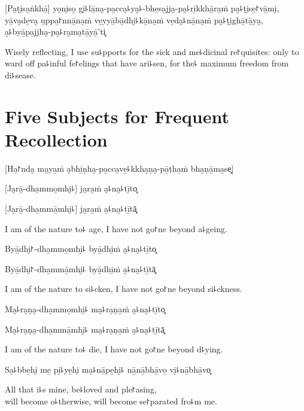 [Pa̮ṭi̮sa̱ṅkhā̱] yo̱ni̮so̱ gi̮꜕lā̱na̮-pa̱cca̮꜕ya̮꜕-bhe̱sa̱jja̮-pa̮꜕ri̱kkhā̱ra̱ṁ pa̮꜕ṭi̮se̱꜓vā̱mi̮, yā̱va̮de̱va̮ u̱ppa̱꜓nnā̱na̱ṁ ve̱yyā̱bā̱dhi̮꜕kā̱na̱ṁ ve̱da̮꜕nā̱na̱ṁ pa̮꜕ṭi̮ghā̱tā̱ya̮, a̮꜕byā̱pa̱jjha̮-pa̮꜕ra̮ma̮tā̱yā̱'ti͓

\begin{english}
  Wisely reflecting, I use su꜕pports for the sick and me꜕dicinal re꜓quisites: only to ward off pa꜕inful fe꜓elings that have ari꜕sen, for the꜕ maximum freedom from di꜕sease.
\end{english}

\chapter[Five Subjects]{Five Subjects for Frequent Recollection}


\begin{leader}
  [Ha̱꜓nda̮ ma̮ya̱ṁ a̮bhi̱ṇha̮-pa̱cca̮ve̱꜕kkha̮ṇa̮-pā̱ṭha̱ṁ bha̮ṇā̱ma̮se͓]
\end{leader}

%
[Ja̮rā̱-dha̱mmo̱mhi̮꜕] ja̮ra̱ṁ a̮꜕na̮꜕tī̱to͓

%
[Ja̮rā̱-dha̱mmā̱mhi̮꜕] ja̮ra̱ṁ a̮꜕na̮꜕tī̱tā͓

\begin{english}
  I am of the nature to꜕ age, I have not go꜓ne beyond a꜕geing.
\end{english}

%
Byā̱dhi̮꜓-dha̱mmo̱mhi̮꜕ byā̱dhi̱ṁ a̮꜕na̮꜕tī̱to͓

%
Byā̱dhi̮꜓-dha̱mmā̱mhi̮꜕ byā̱dhi̱ṁ a̮꜕na̮꜕tī̱tā͓

\begin{english}
  I am of the nature to si꜕cken, I have not go꜓ne beyond si꜕ckness.
\end{english}

%
Ma̮꜕ra̮ṇa̮-dha̱mmo̱mhi̮꜕ ma̮꜕ra̮ṇa̱ṁ a̮꜕na̮꜕tī̱to͓

%
Ma̮꜕ra̮ṇa̮-dha̱mmā̱mhi̮꜕ ma̮꜕ra̮ṇa̱ṁ a̮꜕na̮꜕tī̱tā͓

\begin{english}
  I am of the nature to꜕ die, I have not go꜓ne beyond d꜕ying.
\end{english}

Sa̱꜕bbe̱hi̮ me̱ pi̮꜕ye̱hi̮ ma̮꜕nā̱pe̱hi̮꜕ nā̱nā̱bhā̱vo̱ vi̮꜕nā̱bhā̱vo͓

\begin{english}
  All that i꜕s mine, be꜕loved and ple꜓asing,\\
  will become o꜕therwise, will become se꜓parated fro꜕m me.
\end{english}

